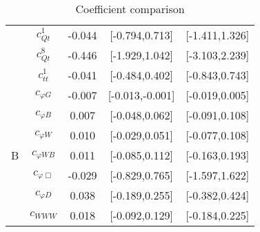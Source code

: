 \documentclass{article}
\begin{document}
\begin{table}[H]
\begin{tabular}{|c|c|c|c|c|}
 & $c_{Qt}^{1}$ & -0.044 & [-0.794,0.713] & [-1.411,1.326]  \\ \cline{2-5}
 & $c_{Qt}^{8}$ & -0.446 & [-1.929,1.042] & [-3.103,2.239]  \\ \cline{2-5}
 & $c_{tt}^{1}$ & -0.041 & [-0.484,0.402] & [-0.843,0.743]  \\ \cline{2-5}
\hline
\multirow{7}{*}{B}
 & $c_{\varphi G}$ & -0.007 & [-0.013,-0.001] & [-0.019,0.005]  \\ \cline{2-5}
 & $c_{\varphi B}$ & 0.007 & [-0.048,0.062] & [-0.091,0.108]  \\ \cline{2-5}
 & $c_{\varphi W}$ & 0.010 & [-0.029,0.051] & [-0.077,0.108]  \\ \cline{2-5}
 & $c_{\varphi WB}$ & 0.011 & [-0.085,0.112] & [-0.163,0.193]  \\ \cline{2-5}
 & $c_{\varphi \Box}$ & -0.029 & [-0.829,0.765] & [-1.597,1.622]  \\ \cline{2-5}
 & $c_{\varphi D}$ & 0.038 & [-0.189,0.255] & [-0.382,0.424]  \\ \cline{2-5}
 & $c_{WWW}$ & 0.018 & [-0.092,0.129] & [-0.184,0.225]  \\ \cline{2-5}
\hline
\end{tabular}
\caption{Coefficient comparison}
\end{table}
\end{document}
